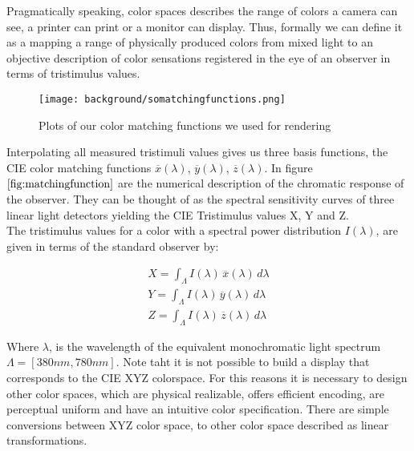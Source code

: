 Pragmatically speaking, color spaces describes the range of colors a camera can see, a printer can print or a monitor can display. Thus, formally we can define it as a mapping a range of physically produced colors from mixed light to an objective description of color
sensations registered in the eye of an observer in terms of tristimulus values. 

\begin{figure}[H]
  \centering
  \texttt{[image: background/somatchingfunctions.png]}
  \caption[Color Matching Functions]{Plots of our color matching functions we used for rendering}
  \label{fig:matchingfunction}
\end{figure}

Interpolating all measured tristimuli values gives us three basis functions, the CIE color matching functions $\overline{x}(\lambda)$, $\overline{y}(\lambda)$, $\overline{z}(\lambda)$. In figure $\ref{fig:matchingfunction}$ are the numerical description of the chromatic response of the observer. They can be thought of as the spectral sensitivity curves of three linear light detectors yielding the CIE Tristimulus values X, Y and Z. \\

The tristimulus values for a color with a spectral power distribution $I(\lambda)$, are given in terms of the standard observer by:

\begin{align}
    X= \int_{\Lambda} I(\lambda)\,\overline{x}(\lambda)\,d\lambda \nonumber \\
    Y= \int_{\Lambda} I(\lambda)\,\overline{y}(\lambda)\,d\lambda \nonumber \\
    Z= \int_{\Lambda} I(\lambda)\,\overline{z}(\lambda)\,d\lambda
\label{eq:tristimulusvalues}
\end{align}

Where $\lambda$, is the wavelength of the equivalent monochromatic light spectrum $\Lambda = [380nm, 780nm]$. Note taht it is not possible to build a display that corresponds to the CIE XYZ colorspace. For this reasons it is necessary to design other color spaces, which are physical realizable, offers efficient encoding, are perceptual uniform and have an intuitive color specification. There are simple conversions between XYZ color space, to other color space described as linear transformations.

